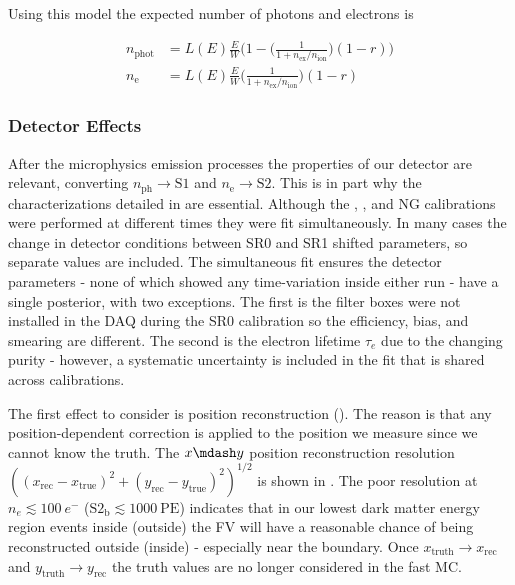 Using this model the expected number of photons and electrons is

\begin{subequations}
\begin{align}
n_{\mathrm{phot}} &= L(E) \frac{E}{W} \Bigg(1 - \bigg(\frac{1}{1 + n_{\mathrm{ex}}/n_{\mathrm{ion}}} \bigg) (1 - r) \Bigg) \\
n_{\mathrm{e}} &= L(E) \frac{E}{W} \bigg(\frac{1}{1 + n_{\mathrm{ex}}/n_{\mathrm{ion}}} \bigg) (1 - r)
\end{align}
\end{subequations}



\subsubsection{Detector Effects}
\label{subsubsec:er_nr_calibrations_parameter_determ_det_phys}
After the microphysics emission processes the properties of our detector are relevant, converting
$n_{\mathrm{ph}} \rightarrow \mathrm{S1}$ and $n_{\mathrm{e}} \rightarrow \mathrm{S2}$.  This is in part why the
characterizations detailed in  are essential.  Although the , , and NG calibrations
were performed at different times they were fit simultaneously.  In many cases the change in detector conditions between SR0 and SR1
shifted parameters, so separate values are included.  The simultaneous fit ensures the detector parameters - none of which showed any
time-variation inside either run - have a single posterior, with two exceptions.  The first is the filter boxes were not installed in the
DAQ during the SR0 \ambe calibration so the efficiency, bias, and smearing are different.  The second is the electron lifetime $\tau_{e}$
due to the changing purity - however, a systematic uncertainty is included in the fit that is shared across calibrations.

The first effect to consider is position reconstruction ().  The reason is that
any position-dependent correction is applied to the position we measure since we cannot know the truth.  The $x \mdash y$ position
reconstruction resolution $((x_{\mathrm{rec}} - x_{\mathrm{true}})^2 + (y_{\mathrm{rec}} - y_{\mathrm{true}})^2)^{1/2}$ is shown in
.  The poor resolution at
$n_e \lesssim 100\ e^-$ ($\mathrm{S2_b} \lesssim 1000\ \mathrm{PE}$) indicates that in our lowest dark matter energy region events inside
(outside) the FV will have a reasonable chance of being reconstructed outside (inside) - especially near the boundary.  Once
$x_{\mathrm{truth}} \rightarrow x_{\mathrm{rec}}$ and
$y_{\mathrm{truth}} \rightarrow y_{\mathrm{rec}}$ the truth values are no longer considered in the fast MC.


